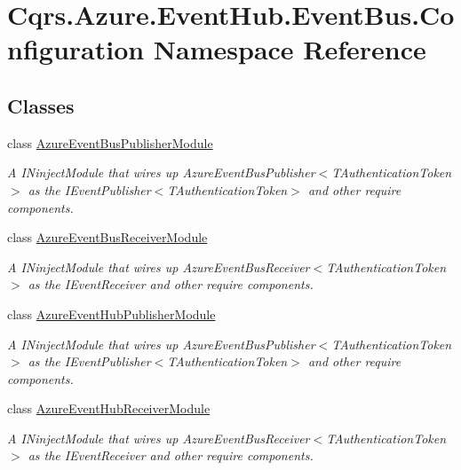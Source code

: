 \hypertarget{namespaceCqrs_1_1Azure_1_1EventHub_1_1EventBus_1_1Configuration}{}\section{Cqrs.\+Azure.\+Event\+Hub.\+Event\+Bus.\+Configuration Namespace Reference}
\label{namespaceCqrs_1_1Azure_1_1EventHub_1_1EventBus_1_1Configuration}
\subsection*{Classes}
\begin{DoxyCompactItemize}
\item 
class \hyperlink{classCqrs_1_1Azure_1_1EventHub_1_1EventBus_1_1Configuration_1_1AzureEventBusPublisherModule}{Azure\+Event\+Bus\+Publisher\+Module}
\begin{DoxyCompactList}\small\item\em A I\+Ninject\+Module that wires up Azure\+Event\+Bus\+Publisher$<$\+T\+Authentication\+Token$>$ as the I\+Event\+Publisher$<$\+T\+Authentication\+Token$>$ and other require components. \end{DoxyCompactList}\item 
class \hyperlink{classCqrs_1_1Azure_1_1EventHub_1_1EventBus_1_1Configuration_1_1AzureEventBusReceiverModule}{Azure\+Event\+Bus\+Receiver\+Module}
\begin{DoxyCompactList}\small\item\em A I\+Ninject\+Module that wires up Azure\+Event\+Bus\+Receiver$<$\+T\+Authentication\+Token$>$ as the I\+Event\+Receiver and other require components. \end{DoxyCompactList}\item 
class \hyperlink{classCqrs_1_1Azure_1_1EventHub_1_1EventBus_1_1Configuration_1_1AzureEventHubPublisherModule}{Azure\+Event\+Hub\+Publisher\+Module}
\begin{DoxyCompactList}\small\item\em A I\+Ninject\+Module that wires up Azure\+Event\+Bus\+Publisher$<$\+T\+Authentication\+Token$>$ as the I\+Event\+Publisher$<$\+T\+Authentication\+Token$>$ and other require components. \end{DoxyCompactList}\item 
class \hyperlink{classCqrs_1_1Azure_1_1EventHub_1_1EventBus_1_1Configuration_1_1AzureEventHubReceiverModule}{Azure\+Event\+Hub\+Receiver\+Module}
\begin{DoxyCompactList}\small\item\em A I\+Ninject\+Module that wires up Azure\+Event\+Bus\+Receiver$<$\+T\+Authentication\+Token$>$ as the I\+Event\+Receiver and other require components. \end{DoxyCompactList}\item 

\end{DoxyCompactItemize}

